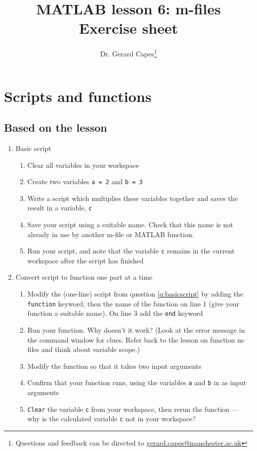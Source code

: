 \documentclass{article}
\title{MATLAB lesson 6: m-files\\Exercise sheet}
\date{}
\author{Dr. Gerard Capes\thanks{Questions and feedback can be directed to \href{mailto:gerard.capes@manchester.ac.uk?subject=Feedback on MATLAB lesson 6 (m-files) exercise sheet}{gerard.capes@manchester.ac.uk}}}
\begin{document}
	\maketitle
	
	\section{Scripts and functions}
	\subsection*{Based on the lesson}
	\begin{enumerate}
		\item Basic script
		\label{q:basicscript}
		\begin{enumerate}
			\item Clear all variables in your workspace
			\item Create two variables \texttt{a = 2} and \texttt{b = 3}
			\item Write a script which multiplies these variables together and saves the result in a variable, \texttt{c}
			\item Save your script using a suitable name. Check that this name is not already in use by another m-file or MATLAB function.	
			\item Run your script, and note that the variable \texttt{c} remains in the current workspace after the script has finished
		\end{enumerate}
		\item Convert script to function one part at a time
		\begin{enumerate}
			\item Modify the (one-line) script from question \ref{q:basicscript} by adding the \texttt{function} keyword, then the name of the function on line 1 (give your function a suitable name). On line 3 add the \texttt{end} keyword
			\item Run your function. Why doesn't it work? (Look at the error message in the command window for clues. Refer back to the lesson on function m-files and think about variable scope.)
			\item Modify the function so that it takes two input arguments
			\item Confirm that your function runs, using the variables \texttt{a} and \texttt{b} in as input arguments
			\item \texttt{Clear} the variable \texttt{c} from your workspace, then rerun the function --- why is the calculated variable \texttt{c} not in your workspace?

\end{enumerate}
\end{enumerate}
\end{document}
